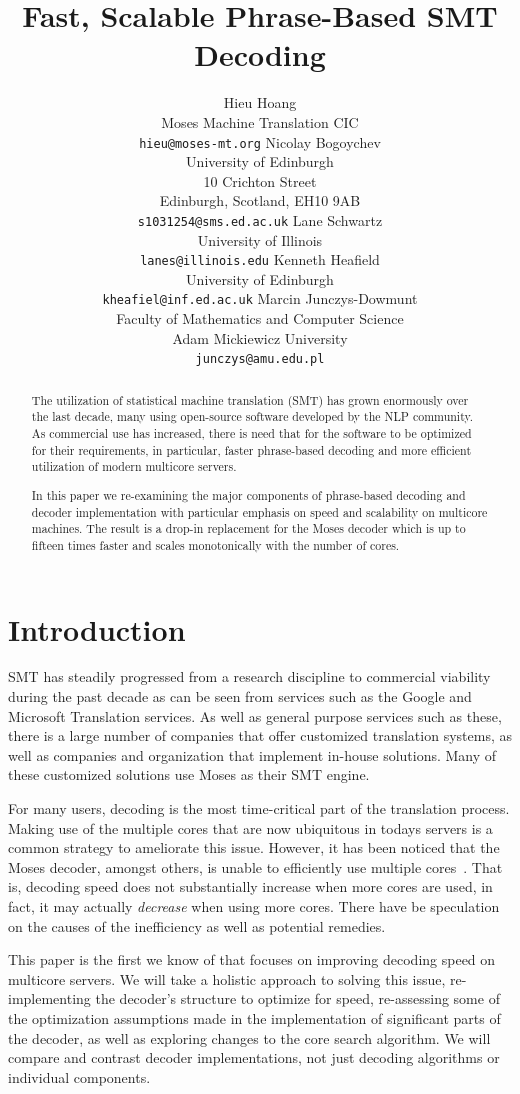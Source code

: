\documentclass[11pt]{article}
\title{Fast, Scalable Phrase-Based SMT Decoding}
\author{Hieu Hoang\\
	    Moses Machine Translation CIC\\
	    {\tt hieu@moses-mt.org}
	  \And
	Nicolay Bogoychev\\
  	University of Edinburgh\\
  	10 Crichton Street\\
  	Edinburgh, Scotland, EH10 9AB\\
  {\tt s1031254@sms.ed.ac.uk}
	  \And
	Lane Schwartz\\
  	University of Illinois\\
  {\tt lanes@illinois.edu}
	  \AND
	Kenneth Heafield\\
  	University of Edinburgh\\
  {\tt kheafiel@inf.ed.ac.uk}
	  \And
	Marcin Junczys-Dowmunt\\
	Faculty of Mathematics and Computer Science \\
	Adam Mickiewicz University\\
  {\tt junczys@amu.edu.pl}
	}
\date{}
\begin{document}
\maketitle

\begin{abstract}
The utilization of statistical machine translation (SMT) has grown enormously over the last decade, many using open-source software developed by the NLP community. As commercial use has increased, there is need that for the software to be optimized for their requirements, in particular, faster phrase-based decoding and more efficient utilization of modern multicore servers.

In this paper we re-examining the major components of phrase-based decoding and decoder implementation with particular emphasis on speed and scalability on multicore machines. The result is a drop-in replacement for the Moses decoder which is up to fifteen times faster and scales monotonically with the number of cores. 

\end{abstract}

\section{Introduction}

SMT has steadily progressed from a research discipline to commercial viability during the past decade as can be seen from services such as the Google and Microsoft Translation services. As well as general purpose services such as these, there is a large number of companies that offer customized translation systems, as well as  companies and organization that implement in-house solutions. Many of these customized solutions use Moses as their SMT engine.

For many users, decoding is the most time-critical part of the translation process. Making use of the multiple cores that are now ubiquitous in todays servers is a common strategy to ameliorate this issue. However, it has been noticed that the Moses decoder, amongst others, is unable to efficiently use multiple cores~\cite{mfernandez2016boosting}. That is, decoding speed does not substantially increase when more cores are used, in fact, it may actually \emph{decrease} when using more cores. There have be speculation on the causes of the inefficiency as well as potential remedies. 

This paper is the first we know of that focuses on improving decoding speed on multicore servers. We will take a holistic approach to solving this issue, re-implementing the decoder's structure to optimize for speed, re-assessing some of the optimization assumptions made in the implementation of significant parts of the decoder, as well as exploring changes to the core search algorithm. We will compare and contrast decoder implementations, not just decoding algorithms or individual components. 
\end{document}
